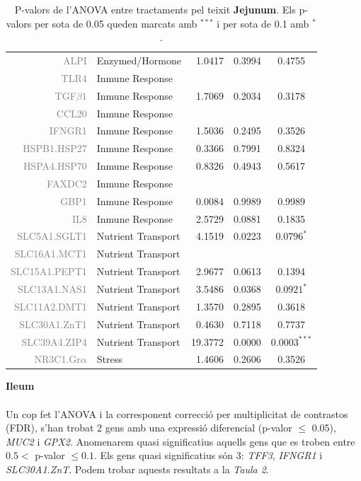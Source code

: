 \documentclass[english]{article}
\begin{document}
\begin{table}[ht]
\begin{tabular}{rlrrc}
  {\textcolor{gray}{ALPI}} & Enzymed/Hormone & 1.0417 & 0.3994 & 0.4755 \\
  {\textcolor{gray}{TLR4}} & Inmune Response &  &  &  \\
  {\textcolor{gray}{TGF$\beta1$}} & Inmune Response & 1.7069 & 0.2034 & 0.3178 \\
  {\textcolor{gray}{CCL20}} & Inmune Response &  &  &  \\
  {\textcolor{gray}{IFNGR1}} & Inmune Response & 1.5036 & 0.2495 & 0.3526 \\
  {\textcolor{gray}{HSPB1.HSP27}} & Inmune Response & 0.3366 & 0.7991 & 0.8324 \\
  {\textcolor{gray}{HSPA4.HSP70}} & Inmune Response & 0.8326 & 0.4943 & 0.5617 \\
  {\textcolor{gray}{FAXDC2}} & Inmune Response &  &  &  \\
  {\textcolor{gray}{GBP1}} & Inmune Response & 0.0084 & 0.9989 & 0.9989 \\
  {\textcolor{gray}{IL8}} & Inmune Response & 2.5729 & 0.0881 & 0.1835 \\
  {\textcolor{gray}{SLC5A1.SGLT1}} & Nutrient Transport & 4.1519 & 0.0223 & $0.0796^{*}$  \\
  {\textcolor{gray}{SLC16A1.MCT1}} & Nutrient Transport &  &  &  \\
  {\textcolor{gray}{SLC15A1.PEPT1}} & Nutrient Transport & 2.9677 & 0.0613 & 0.1394 \\
  {\textcolor{gray}{SLC13A1.NAS1}} & Nutrient Transport & 3.5486 & 0.0368 & $0.0921^{*}$  \\
  {\textcolor{gray}{SLC11A2.DMT1}} & Nutrient Transport & 1.3570 & 0.2895 & 0.3618 \\
  {\textcolor{gray}{SLC30A1.ZnT1}} & Nutrient Transport & 0.4630 & 0.7118 & 0.7737 \\
  {\textcolor{gray}{SLC39A4.ZIP4}} & Nutrient Transport & 19.3772 & 0.0000 & $0.0003^{***}$ \\
  {\textcolor{gray}{NR3C1.Gr$\alpha$}} & Stress & 1.4606 & 0.2606 & 0.3526 \\
   \bottomrule
\end{tabular}
\caption{P-valors de l'ANOVA entre tractaments pel teixit \textbf{Jejunum}. Els p-valors per sota de 0.05 queden marcats amb $^{***}$ i per sota de 0.1 amb $^{*}$.}
\end{table}
\noindent\textbf{Ileum}\\
\\
Un cop fet l'ANOVA i la corresponent correcció per multiplicitat de contrastos (FDR), s'han trobat 2 gens amb una expressió diferencial (p-valor $\leq$ 0.05), \textit{MUC2} i \textit{GPX2}. Anomenarem quasi significatius aquells gens que es troben entre $0.5 <$ p-valor $\leq 0.1$. Els gens quasi significatius són 3: \textit{TFF3}, \textit{IFNGR1} i \textit{SLC30A1.ZnT}. Podem trobar aquests resultats a la \textit{Taula 2}.\\
\end{document}
